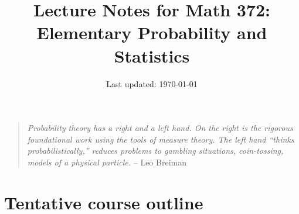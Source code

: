 \documentclass[10pt]{article}
\title{Lecture Notes for Math 372: \\Elementary Probability and Statistics}
\date{Last updated: \today}
\theoremstyle{definition}
\newcommand{\1}[1]{\textbf{1}_{\left[#1\right]}} %
\begin{document}
\maketitle


\begin{quote}
  \textit{Probability theory has a right and a left hand. On the right is the rigorous foundational work using
    the tools of measure theory. The left hand ``thinks probabilistically,'' reduces problems to gambling
    situations, coin-tossing, models of a physical particle.} -- Leo Breiman
\end{quote}


\tableofcontents

\newpage
\setcounter{section}{-1}
\section{Tentative course outline}
\end{document}
